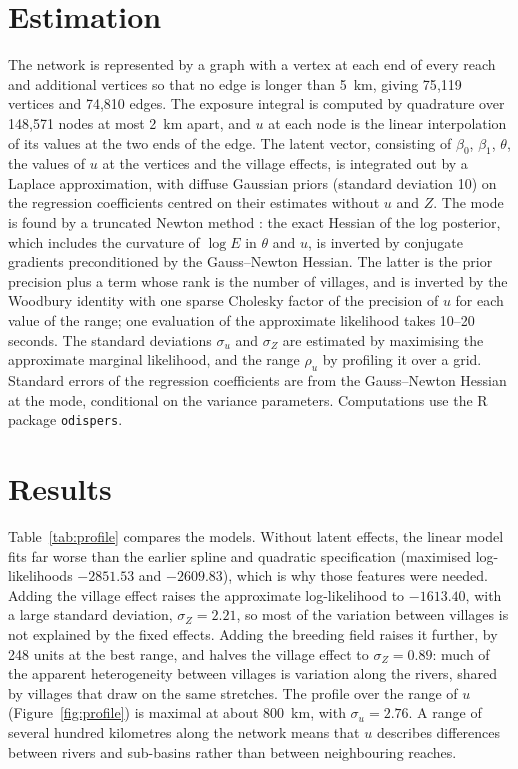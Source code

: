 \documentclass[11pt,a4paper]{article}
\begin{document}
\section{Estimation}

The network is represented by a graph with a vertex at each end of every reach and additional vertices so that no edge is longer than 5~km, giving 75{,}119 vertices and 74{,}810 edges. The exposure integral is computed by quadrature over 148{,}571 nodes at most 2~km apart, and $u$ at each node is the linear interpolation of its values at the two ends of the edge. The latent vector, consisting of $\beta_0$, $\beta_1$, $\theta$, the values of $u$ at the vertices and the village effects, is integrated out by a Laplace approximation, with diffuse Gaussian priors (standard deviation 10) on the regression coefficients centred on their estimates without $u$ and $Z$. The mode is found by a truncated Newton method \citep{steihaug1983}: the exact Hessian of the log posterior, which includes the curvature of $\log E$ in $\theta$ and $u$, is inverted by conjugate gradients preconditioned by the Gauss--Newton Hessian. The latter is the prior precision plus a term whose rank is the number of villages, and is inverted by the Woodbury identity with one sparse Cholesky factor of the precision of $u$ for each value of the range; one evaluation of the approximate likelihood takes 10--20 seconds. The standard deviations $\sigma_u$ and $\sigma_Z$ are estimated by maximising the approximate marginal likelihood, and the range $\rho_u$ by profiling it over a grid. Standard errors of the regression coefficients are from the Gauss--Newton Hessian at the mode, conditional on the variance parameters. Computations use the R package \texttt{odispers}.

\section{Results}

Table~\ref{tab:profile} compares the models. Without latent effects, the linear model fits far worse than the earlier spline and quadratic specification (maximised log-likelihoods $-2851.53$ and $-2609.83$), which is why those features were needed. Adding the village effect raises the approximate log-likelihood to $-1613.40$, with a large standard deviation, $\sigma_Z = 2.21$, so most of the variation between villages is not explained by the fixed effects. Adding the breeding field raises it further, by 248 units at the best range, and halves the village effect to $\sigma_Z = 0.89$: much of the apparent heterogeneity between villages is variation along the rivers, shared by villages that draw on the same stretches. The profile over the range of $u$ (Figure~\ref{fig:profile}) is maximal at about 800~km, with $\sigma_u = 2.76$. A range of several hundred kilometres along the network means that $u$ describes differences between rivers and sub-basins rather than between neighbouring reaches.
\end{document}
